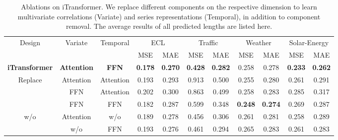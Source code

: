\documentclass{article} %
\begin{document}
\vspace{-10pt}
\begin{table}[htbp]
\caption{Ablations on iTransformer. We replace different components on the respective dimension to learn multivariate correlations (Variate) and series representations (Temporal), in addition to component removal. The average results of all predicted lengths are listed here.}
\label{tab:ablation}
\vspace{5pt}
\centering
\begin{small}
    \renewcommand{\multirowsetup}{\centering}
    \setlength{\tabcolsep}{5.3pt}
    \begin{tabular}{c|c|c|cc|cc|cc|cc}
    \toprule
    \multirow{2}{*}{Design} &\multirow{2}{*}{Variate} & \multirow{2}{*}{Temporal} & \multicolumn{2}{c|}{ECL} & \multicolumn{2}{c|}{Traffic} & \multicolumn{2}{c|}{Weather} & \multicolumn{2}{c}{Solar-Energy}\\
    \cmidrule(lr){4-5} \cmidrule(lr){6-7}  \cmidrule(lr){8-9} \cmidrule(lr){10-11} 
    & & & MSE & MAE & MSE & MAE  & MSE & MAE & MSE & MAE \\
    \midrule
     \textbf{iTransformer} & \textbf{Attention} & \textbf{FFN} & \textbf{0.178} & \textbf{0.270} & \textbf{0.428} & \textbf{0.282} & 0.258 & 0.278 & \textbf{0.233} & \textbf{0.262}\\
     \midrule
     \multirow{3}{*}{Replace}& Attention & Attention & 0.193 & 0.293 & 0.913 & 0.500 & 0.255 & 0.280 & 0.261 & 0.291\\
     & FFN & Attention & 0.202 & 0.300 & 0.863 & 0.499 & 0.258 & 0.283 & 0.285 & 0.317 \\
     & FFN & FFN & 0.182 & 0.287 & 0.599 & 0.348 & \textbf{0.248} & \textbf{0.274} & 0.269 & 0.287\\
    \midrule
    \multirow{2}{*}{w/o} & Attention & w/o & 0.189 & 0.278 & 0.456 & 0.306 & 0.261 & 0.281 & 0.258 & 0.289\\
     & w/o & FFN & 0.193 & 0.276 & 0.461 & 0.294 & 0.265 & 0.283 & 0.261 & 0.283 \\
    \bottomrule
    \end{tabular}
\end{small}
\end{table}
\end{document}
